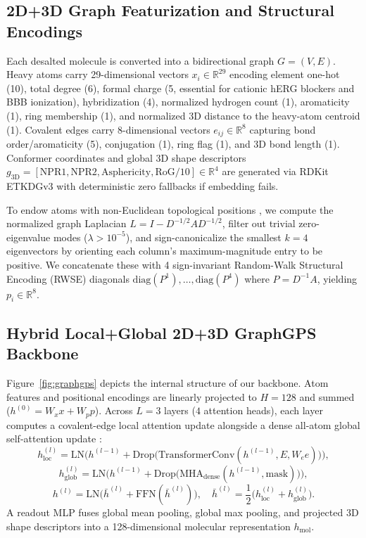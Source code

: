 \documentclass[conference]{IEEEtran}
\begin{document}
\subsection{2D+3D Graph Featurization and Structural Encodings}
Each desalted molecule is converted into a bidirectional graph $G = (V, E)$. Heavy atoms carry 29-dimensional vectors $x_i \in \mathbb{R}^{29}$ encoding element one-hot (10), total degree (6), formal charge (5, essential for cationic hERG blockers and BBB ionization), hybridization (4), normalized hydrogen count (1), aromaticity (1), ring membership (1), and normalized 3D distance to the heavy-atom centroid (1). Covalent edges carry 8-dimensional vectors $e_{ij} \in \mathbb{R}^8$ capturing bond order/aromaticity (5), conjugation (1), ring flag (1), and 3D bond length (1). Conformer coordinates and global 3D shape descriptors $g_{\text{3D}} = [\text{NPR1}, \text{NPR2}, \text{Asphericity}, \text{RoG}/10] \in \mathbb{R}^4$ are generated via RDKit ETKDGv3 \cite{Riniker2015ETKDG} with deterministic zero fallbacks if embedding fails.

To endow atoms with non-Euclidean topological positions \cite{Dwivedi2022LSPE}, we compute the normalized graph Laplacian $L = I - D^{-1/2} A D^{-1/2}$, filter out trivial zero-eigenvalue modes ($\lambda > 10^{-5}$), and sign-canonicalize the smallest $k=4$ eigenvectors by orienting each column's maximum-magnitude entry to be positive. We concatenate these with 4 sign-invariant Random-Walk Structural Encoding (RWSE) diagonals $\text{diag}(P^1), \dots, \text{diag}(P^4)$ where $P = D^{-1}A$, yielding $p_i \in \mathbb{R}^8$.

\subsection{Hybrid Local+Global 2D+3D GraphGPS Backbone}
Figure~\ref{fig:graphgps} depicts the internal structure of our backbone. Atom features and positional encodings are linearly projected to $H = 128$ and summed ($h^{(0)} = W_x x + W_p p$). Across $L=3$ layers ($4$ attention heads), each layer computes a covalent-edge local attention update \cite{Shi2021TransformerConv} alongside a dense all-atom global self-attention update \cite{Rampasek2022GraphGPS}:
\begin{equation}
h_{\text{loc}}^{(l)} = \text{LN}\!\Big(h^{(l-1)} + \text{Drop}\big(\text{TransformerConv}(h^{(l-1)}, E, W_e e)\big)\Big),
\end{equation}
\begin{equation}
h_{\text{glob}}^{(l)} = \text{LN}\!\Big(h^{(l-1)} + \text{Drop}\big(\text{MHA}_{\text{dense}}(h^{(l-1)}, \text{mask})\big)\Big),
\end{equation}
\begin{equation}
h^{(l)} = \text{LN}\!\Big(\bar{h}^{(l)} + \text{FFN}(\bar{h}^{(l)})\Big), \quad \bar{h}^{(l)} = \frac{1}{2}\big(h_{\text{loc}}^{(l)} + h_{\text{glob}}^{(l)}\big).
\end{equation}
A readout MLP fuses global mean pooling, global max pooling, and projected 3D shape descriptors into a 128-dimensional molecular representation $h_{\text{mol}}$.
\end{document}
